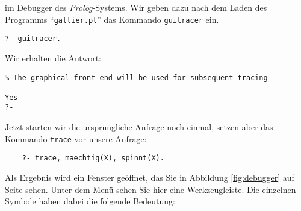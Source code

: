 im Debugger des \textsl{Prolog}-Systems.  Wir geben dazu nach dem Laden des
Programms ``\texttt{gallier.pl}'' das Kommando \texttt{guitracer} ein.
\begin{verbatim}
?- guitracer.
\end{verbatim}
Wir erhalten die Antwort:
\begin{verbatim}
% The graphical front-end will be used for subsequent tracing

Yes
?- 
\end{verbatim}
Jetzt starten wir die urspr\"{u}ngliche Anfrage noch einmal, setzen aber das Kommando
\texttt{trace} vor unsere Anfrage:
\begin{verbatim}
    ?- trace, maechtig(X), spinnt(X).
\end{verbatim}
Als Ergebnis wird ein Fenster ge\"{o}ffnet, das Sie in Abbildung \ref{fig:debugger} auf Seite
\pageref{fig:debugger} sehen.  Unter dem Men\"{u} sehen Sie hier eine Werkzeugleiste.
Die einzelnen Symbole haben dabei die folgende Bedeutung:
